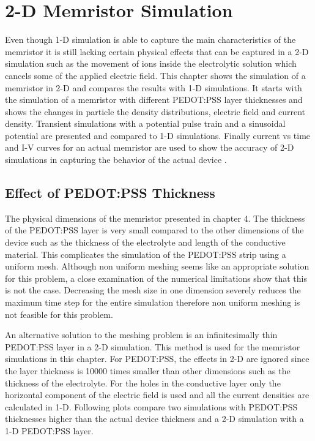 \chapter{2-D Memristor Simulation} %

\label{Chapter7} %

\begin{doublespace}

Even though 1-D simulation is able to capture the main characteristics of the memristor it is still lacking certain physical effects that can be captured in a 2-D simulation such as the movement of ions inside the electrolytic solution which cancels some of the applied electric field. This chapter shows the simulation of a memristor in 2-D and compares the results with 1-D simulations. It starts with the simulation of a memristor with different PEDOT:PSS layer thicknesses and shows the changes in particle the density distributions, electric field and current density. Transient simulations with a potential pulse train and a sinusoidal potential are presented and compared to 1-D simulations. Finally current vs time and I-V curves for an actual memristor are used to show the accuracy of 2-D simulations in capturing the behavior of the actual device .  

\section{Effect of PEDOT:PSS Thickness}

The physical dimensions of the memristor  presented in chapter 4. The thickness of the PEDOT:PSS layer is very small compared to the other dimensions of the device such as the thickness of the electrolyte and length of the conductive material. This complicates the simulation of the PEDOT:PSS strip using a uniform mesh. Although non uniform meshing seems like an appropriate solution for this problem, a close examination of the numerical limitations show that this is not the case. Decreasing the mesh size in one dimension severely reduces the maximum time step for the entire simulation therefore non uniform meshing is not feasible for this problem. 

An alternative solution to the meshing problem is  an infinitesimally thin PEDOT:PSS layer in a 2-D simulation. This method is used for the memristor simulations in this chapter. For PEDOT:PSS, the effects in 2-D are ignored since the layer thickness is 10000 times smaller than other dimensions such as the thickness of the electrolyte. For the holes in the conductive layer only the horizontal component of the electric field is used and all the current densities are calculated in 1-D. Following plots compare two simulations with PEDOT:PSS thicknesses higher than the actual device thickness and a 2-D simulation with a 1-D PEDOT:PSS layer.  


\end{doublespace}
